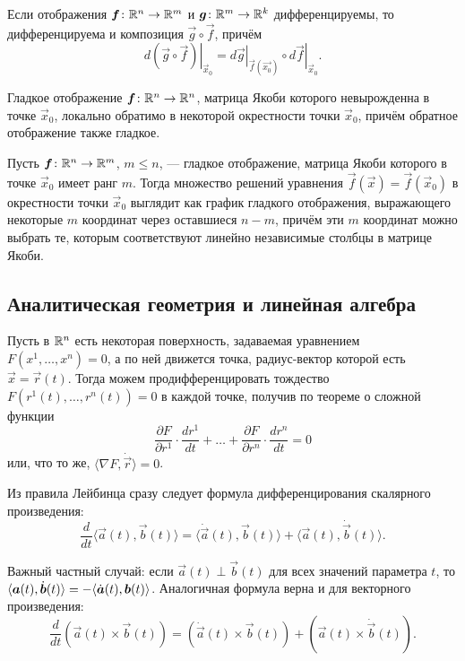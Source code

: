 \begin{theorem}
	Если отображения $\boldsymbol{f}\colon \mathbb{R}^n \to \mathbb{R}^m$ и $\boldsymbol{g}\colon \mathbb{R}^m \to \mathbb{R}^k$ дифференцируемы, то дифференцируема и композиция $\vec{g} \circ \vec{f}$, причём
	\[
		\left.d(\vec{g} \circ \vec{f})\right|_{\vec{x}_0} = \left.d\vec{g}\right|_{\vec{f}(\vec{x_0})} \circ \left.d\vec{f}\right|_{\vec{x}_0}.
	\]
\end{theorem}

\begin{theorem}
	Гладкое отображение $\boldsymbol{f}\colon \mathbb{R}^n \to \mathbb{R}^n$, матрица Якоби которого невырожденна в точке $\vec{x}_0$, локально обратимо в некоторой окрестности точки $\vec{x}_0$, причём обратное отображение также гладкое.
\end{theorem}

\begin{theorem}
	Пусть $\boldsymbol{f}\colon \mathbb{R}^n \to \mathbb{R}^m$, $m \leqslant n$, --- гладкое отображение, матрица Якоби которого в точке $\vec{x}_0$ имеет ранг $m$. Тогда множество решений уравнения $\vec{f}(\vec{x}) = \vec{f}(\vec{x}_0)$ в окрестности точки $\vec{x}_0$ выглядит как график гладкого отображения, выражающего некоторые $m$ координат через оставшиеся $n - m$, причём эти $m$ координат можно выбрать те, которым соответствуют линейно независимые столбцы в матрице Якоби.
\end{theorem}

\subsection*{Аналитическая геометрия и линейная алгебра}

Пусть в $\mathbb{R}^n$ есть некоторая поверхность, задаваемая уравнением $F(x^1, \ldots, x^n) = 0$, а по ней движется точка, радиус-вектор которой есть $\vec{x} = \vec{r}(t)$. Тогда можем продифференцировать тождество $F(r^1(t), \ldots, r^n(t)) = 0$ в каждой точке, получив по теореме о сложной функции
\[
	\frac{\partial F}{\partial r^1} \cdot \frac{d r^1}{dt} + \ldots + \frac{\partial F}{\partial r^n} \cdot \frac{d r^n}{dt} = 0
\]
или, что то же, $\langle \nabla F, \dot{\vec{r}} \rangle = 0$.

Из правила Лейбинца сразу следует формула дифференцирования скалярного произведения:
\[
	\frac{d}{dt}\langle \vec{a}(t), \vec{b}(t) \rangle = \langle \dot{\vec{a}}(t), \vec{b}(t) \rangle + \langle \vec{a}(t), \dot{\vec{b}}(t) \rangle.
\]

Важный частный случай: если $\vec{a}(t) \perp \vec{b}(t)$ для всех значений параметра $t$, то $\langle\vec{a}(t), \dot{\vec{b}}(t)\rangle \hm= -\langle\dot{\vec{a}}(t), \vec{b}(t)\rangle$. Аналогичная формула верна и для векторного произведения:
\[
	\frac{d}{dt}(\vec{a}(t) \times \vec{b}(t)) = (\dot{\vec{a}}(t) \times \vec{b}(t)) + (\vec{a}(t) \times \dot{\vec{b}}(t)).
\]

